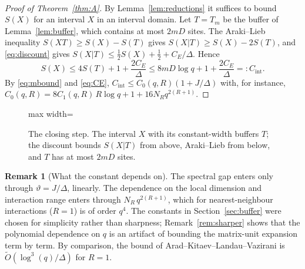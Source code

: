 \documentclass[aps,prx,reprint,superscriptaddress,floatfix,nofootinbib,longbibliography,amsmath,amssymb]{revtex4-2}
\theoremstyle{plain}
\theoremstyle{definition}
\newtheorem{remark}[theorem]{Remark}
\newcommand{\precisely}{\par\noindent{\bfseries Precisely.}\ }
\begin{document}
\precisely
\begin{proof}[Proof of Theorem~\ref{thm:A}]
By Lemma~\ref{lem:reductions} it suffices to bound $S(X)$ for an interval
$X$ in an interval domain. Let $T=T_m$ be the buffer of
Lemma~\ref{lem:buffer}, which contains at most $2mD$ sites. The Araki--Lieb
inequality $S(XT)\ge S(X)-S(T)$ gives $S(X|T)\ge S(X)-2S(T)$, and
\eqref{eq:discount} gives $S(X|T)\le\frac12S(X)+\frac12+C_E/\Delta$. Hence
\begin{equation}\label{eq:final}
 S(X)\le 4S(T)+1+\frac{2C_E}{\Delta}\le 8mD\log q+1+\frac{2C_E}{\Delta}=:C_{\mathrm{int}}.
\end{equation}
By \eqref{eq:mbound} and \eqref{eq:CE}, $C_{\mathrm{int}}\le C_0(q,R)(1+J/\Delta)$
with, for instance,
$C_0(q,R)=8C_1(q,R)\,R\log q+1+16N_Rq^{2(R+1)}$.
\end{proof}

\begin{figure}[t]
\centering
\begin{adjustbox}{max width=\linewidth}

\end{adjustbox}
\caption{The closing step. The interval $X$ with its constant-width buffers $T$; the discount bounds $S(X|T)$ from above, Araki–Lieb from below, and $T$ has at most $2mD$ sites.}\label{fig:closing}
\end{figure}

\begin{remark}[What the constant depends on]\label{rem:constants}
The spectral gap enters only through $\vartheta=J/\Delta$, linearly. The
dependence on the local dimension and interaction range enters through
$N_R\,q^{2(R+1)}$, which for nearest-neighbour interactions ($R=1$) is of
order $q^4$. The constants in Section~\ref{sec:buffer} were chosen for
simplicity rather than sharpness; Remark~\ref{rem:sharper} shows that the
polynomial dependence on $q$ is an artifact of bounding the matrix-unit
expansion term by term. By comparison, the bound of
Arad--Kitaev--Landau--Vazirani \cite{AKLV} is $\tilde O(\log^3(q)/\Delta)$
for $R=1$.
\end{remark}
\end{document}
